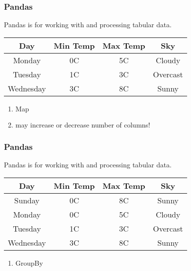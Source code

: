 \documentclass{beamer}
\begin{document}
  \begin{frame}[fragile]
    \frametitle{Pandas}
      Pandas is for working with and processing tabular data. \vspace{1cm}
   
  \begin{tabular}{|c|c|c|c|}
  \hline
  Day & Min Temp & Max Temp & Sky \\ \hline
  Monday  & 0C & 5C & Cloudy \\
  Tuesday & 1C & 3C & Overcast \\
  Wednesday & 3C & 8C & Sunny \\ \hline
  
  \end{tabular} \vspace{0.5cm}
      \begin{enumerate}
        \item<2 -> Map
        \item<3 -> may increase or decrease number of columns!
      \end{enumerate}
  \end{frame}

  \begin{frame}[fragile]
    \frametitle{Pandas}
      Pandas is for working with and processing tabular data. \vspace{1cm}
   
  \begin{tabular}{|c|c|c|c|}
  \hline
  Day & Min Temp & Max Temp & Sky \\ \hline
  Sunday  & 0C & 8C & Sunny \\
  Monday  & 0C & 5C & Cloudy \\
  Tuesday & 1C & 3C & Overcast \\
  Wednesday & 3C & 8C & Sunny \\ \hline
  
  \end{tabular} \vspace{0.5cm}
      \begin{enumerate}
        \item<2 -> GroupBy
      \end{enumerate}
  \end{frame}





\end{document}
